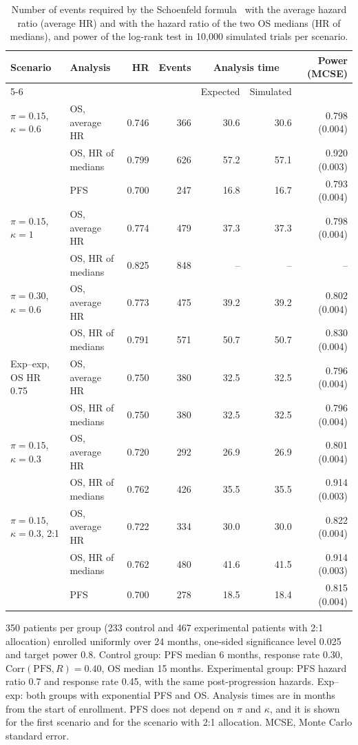 \begin{table}[htbp]
\centering
\caption{Number of events required by the Schoenfeld formula~\cite{Schoenfeld1981} with the average hazard ratio (average HR) and with the hazard ratio of the two OS medians (HR of medians), and power of the log-rank test in 10,000 simulated trials per scenario.}
\label{tab:events}
\begin{threeparttable}
\footnotesize\setlength{\tabcolsep}{4pt}
\begin{tabular}{p{2.1cm}p{2.4cm}rrrrr}
\toprule
Scenario & Analysis & HR & Events & \multicolumn{2}{c}{Analysis time} & Power (MCSE) \\
\cmidrule(lr){5-6}
 & & & & Expected & Simulated & \\
\midrule
$\pi = 0.15$, $\kappa = 0.6$ & OS, average HR & 0.746 & 366 & 30.6 & 30.6 & 0.798 (0.004) \\
 & OS, HR of medians & 0.799 & 626 & 57.2 & 57.1 & 0.920 (0.003) \\
 & PFS & 0.700 & 247 & 16.8 & 16.7 & 0.793 (0.004) \\
\midrule
$\pi = 0.15$, $\kappa = 1$ & OS, average HR & 0.774 & 479 & 37.3 & 37.3 & 0.798 (0.004) \\
 & OS, HR of medians & 0.825 & 848\tnote{a} & -- & -- & -- \\
\midrule
$\pi = 0.30$, $\kappa = 0.6$ & OS, average HR & 0.773 & 475 & 39.2 & 39.2 & 0.802 (0.004) \\
 & OS, HR of medians & 0.791 & 571 & 50.7 & 50.7 & 0.830 (0.004) \\
\midrule
Exp--exp, OS HR 0.75 & OS, average HR & 0.750 & 380 & 32.5 & 32.5 & 0.796 (0.004) \\
 & OS, HR of medians & 0.750 & 380 & 32.5 & 32.5 & 0.796 (0.004) \\
\midrule
$\pi = 0.15$, $\kappa = 0.3$ & OS, average HR & 0.720 & 292 & 26.9 & 26.9 & 0.801 (0.004) \\
 & OS, HR of medians & 0.762 & 426 & 35.5 & 35.5 & 0.914 (0.003) \\
\midrule
$\pi = 0.15$, $\kappa = 0.3$, 2:1 & OS, average HR & 0.722 & 334 & 30.0 & 30.0 & 0.822 (0.004) \\
 & OS, HR of medians & 0.762 & 480 & 41.6 & 41.5 & 0.914 (0.003) \\
 & PFS & 0.700 & 278 & 18.5 & 18.4 & 0.815 (0.004) \\
\bottomrule
\end{tabular}
\begin{tablenotes}
\footnotesize
\item 350 patients per group (233 control and 467 experimental patients with 2:1 allocation) enrolled uniformly over 24 months, one-sided significance level 0.025 and target power 0.8. Control group: PFS median 6 months, response rate 0.30, $\mathrm{Corr}(\mathrm{PFS}, R) = 0.40$, OS median 15 months. Experimental group: PFS hazard ratio 0.7 and response rate 0.45, with the same post-progression hazards. Exp--exp: both groups with exponential PFS and OS. Analysis times are in months from the start of enrollment. PFS does not depend on $\pi$ and $\kappa$, and it is shown for the first scenario and for the scenario with 2:1 allocation. MCSE, Monte Carlo standard error.

\end{tablenotes}
\end{threeparttable}
\end{table}
